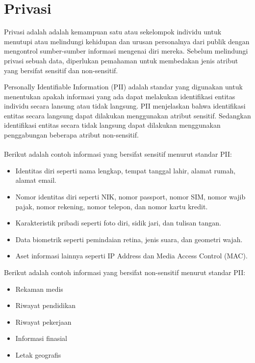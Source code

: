 \label{chap:teori}
\section{Privasi}
Privasi adalah adalah kemampuan satu atau sekelompok individu untuk menutupi atau melindungi kehidupan dan urusan personalnya dari publik dengan mengontrol sumber-sumber informasi mengenai diri mereka. Sebelum melindungi privasi sebuah data, diperlukan pemahaman untuk membedakan jenis atribut yang bersifat sensitif dan non-sensitif. 

\par Personally Identifiable Information  (PII) adalah standar yang digunakan untuk menentukan apakah informasi yang ada dapat melakukan identifikasi entitas individu secara lansung atau tidak langsung. PII menjelaskan bahwa identifikasi entitas secara langsung dapat dilakukan menggunakan atribut sensitif. Sedangkan identifikasi entitas secara tidak langsung dapat dilakukan menggunakan penggabungan beberapa atribut non-sensitif. 
\\\\
Berikut adalah contoh informasi yang bersifat sensitif menurut standar PII:

\begin{itemize}
\item Identitas diri seperti nama lengkap, tempat tanggal lahir, alamat rumah, alamat email.
\item Nomor identitas diri seperti NIK, nomor passport, nomor SIM, nomor wajib pajak, nomor rekening, nomor telepon, dan nomor kartu kredit.
\item Karakteristik pribadi seperti foto diri, sidik jari, dan tulisan tangan.
\item Data biometrik seperti pemindaian retina, jenis suara, dan geometri wajah.
\item Aset informasi lainnya seperti IP Address dan Media Access Control (MAC). 
\end{itemize}

\noindent Berikut adalah contoh informasi yang bersifat non-sensitif menurut standar PII:
\begin{itemize}
\item Rekaman medis
\item Riwayat pendidikan
\item Riwayat pekerjaan 
\item Informasi finasial
\item Letak geografis
\end{itemize}


